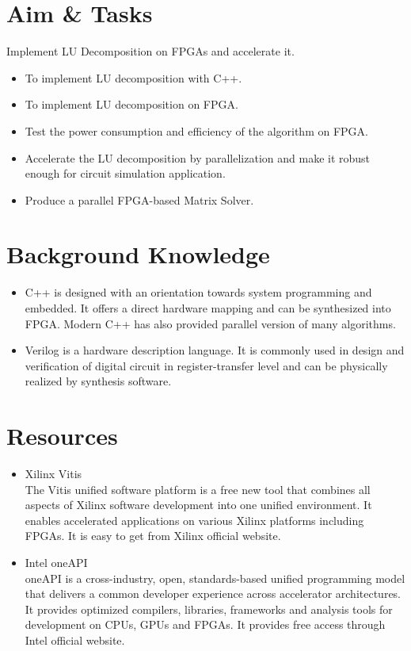 \section*{Aim \& Tasks}
Implement LU Decomposition on FPGAs and accelerate it.
\begin{itemize}
  \item To implement LU decomposition with C++.
  \item	To implement LU decomposition on FPGA.
  \item	Test the power consumption and efficiency of the algorithm on FPGA.
  \item	Accelerate the LU decomposition by parallelization and make it robust enough for circuit simulation application.
  \item	Produce a parallel FPGA-based Matrix Solver.
\end{itemize}

\section*{Background Knowledge}
\begin{itemize}
  \item	C++ is designed with an orientation towards system programming and embedded. It offers a direct hardware mapping and can be synthesized into FPGA. Modern C++ has also provided parallel version of many algorithms.

  \item Verilog is a hardware description language. It is commonly used in design and verification of digital circuit in register-transfer level and can be physically realized by synthesis software.

\end{itemize}

\section*{Resources}
\begin{itemize}
  \item Xilinx Vitis\\
  The Vitis unified software platform is a free new tool that combines all aspects of Xilinx software development into one unified environment. It enables accelerated applications on various Xilinx platforms including FPGAs. It is easy to get from Xilinx official website.
  \item Intel oneAPI\\
  oneAPI is a cross-industry, open, standards-based unified programming model that delivers a common developer experience across accelerator architectures. It provides optimized compilers, libraries, frameworks and analysis tools for development on CPUs, GPUs and FPGAs. It provides free access through Intel official website.

\end{itemize}


